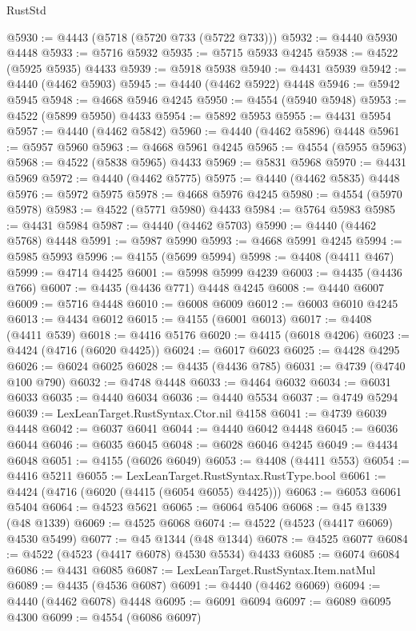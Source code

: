 \begin{lexlean}{RustStd}
\begin{coremodule}
{\begin{coremodule}
{{{{{{{{{{{{{{{{{{{{{{{{{{{{{{{{{{{{{{{{{{{{{{{{{{{{{{{{{{{{@5930 := @4443 (@5718 (@5720 @733 (@5722 @733)))
@5932 := @4440 @5930 @4448
@5933 := @5716 @5932
@5935 := @5715 @5933 @4245
@5938 := @4522 (@5925 @5935) @4433
@5939 := @5918 @5938
@5940 := @4431 @5939
@5942 := @4440 (@4462 @5903)
@5945 := @4440 (@4462 @5922) @4448
@5946 := @5942 @5945
@5948 := @4668 @5946 @4245
@5950 := @4554 (@5940 @5948)
@5953 := @4522 (@5899 @5950) @4433
@5954 := @5892 @5953
@5955 := @4431 @5954
@5957 := @4440 (@4462 @5842)
@5960 := @4440 (@4462 @5896) @4448
@5961 := @5957 @5960
@5963 := @4668 @5961 @4245
@5965 := @4554 (@5955 @5963)
@5968 := @4522 (@5838 @5965) @4433
@5969 := @5831 @5968
@5970 := @4431 @5969
@5972 := @4440 (@4462 @5775)
@5975 := @4440 (@4462 @5835) @4448
@5976 := @5972 @5975
@5978 := @4668 @5976 @4245
@5980 := @4554 (@5970 @5978)
@5983 := @4522 (@5771 @5980) @4433
@5984 := @5764 @5983
@5985 := @4431 @5984
@5987 := @4440 (@4462 @5703)
@5990 := @4440 (@4462 @5768) @4448
@5991 := @5987 @5990
@5993 := @4668 @5991 @4245
@5994 := @5985 @5993
@5996 := @4155 (@5699 @5994)
@5998 := @4408 (@4411 @467)
@5999 := @4714 @4425
@6001 := @5998 @5999 @4239
@6003 := @4435 (@4436 @766)
@6007 := @4435 (@4436 @771) @4448 @4245
@6008 := @4440 @6007
@6009 := @5716 @4448
@6010 := @6008 @6009
@6012 := @6003 @6010 @4245
@6013 := @4434 @6012
@6015 := @4155 (@6001 @6013)
@6017 := @4408 (@4411 @539)
@6018 := @4416 @5176
@6020 := @4415 (@6018 @4206)
@6023 := @4424 (@4716 (@6020 @4425))
@6024 := @6017 @6023
@6025 := @4428 @4295
@6026 := @6024 @6025
@6028 := @4435 (@4436 @785)
@6031 := @4739 (@4740 @100 @790)
@6032 := @4748 @4448
@6033 := @4464 @6032
@6034 := @6031 @6033
@6035 := @4440 @6034
@6036 := @4440 @5534
@6037 := @4749 @5294
@6039 := LexLeanTarget.RustSyntax.Ctor.nil @4158
@6041 := @4739 @6039 @4448
@6042 := @6037 @6041
@6044 := @4440 @6042 @4448
@6045 := @6036 @6044
@6046 := @6035 @6045
@6048 := @6028 @6046 @4245
@6049 := @4434 @6048
@6051 := @4155 (@6026 @6049)
@6053 := @4408 (@4411 @553)
@6054 := @4416 @5211
@6055 := LexLeanTarget.RustSyntax.RustType.bool
@6061 := @4424 (@4716 (@6020 (@4415 (@6054 @6055) @4425)))
@6063 := @6053 @6061 @5404
@6064 := @4523 @5621
@6065 := @6064 @5406
@6068 := @45 @1339 (@48 @1339)
@6069 := @4525 @6068
@6074 := @4522 (@4523 (@4417 @6069) @4530 @5499)
@6077 := @45 @1344 (@48 @1344)
@6078 := @4525 @6077
@6084 := @4522 (@4523 (@4417 @6078) @4530 @5534) @4433
@6085 := @6074 @6084
@6086 := @4431 @6085
@6087 := LexLeanTarget.RustSyntax.Item.natMul
@6089 := @4435 (@4536 @6087)
@6091 := @4440 (@4462 @6069)
@6094 := @4440 (@4462 @6078) @4448
@6095 := @6091 @6094
@6097 := @6089 @6095 @4300
@6099 := @4554 (@6086 @6097)
}}}}}}}}}}}}}}}}}}}}}}}}}}}}}}}}}}}}}}}}}}}}}}}}}}}}}}}}}}}}
\end{coremodule}}
\end{coremodule}
\end{lexlean}
